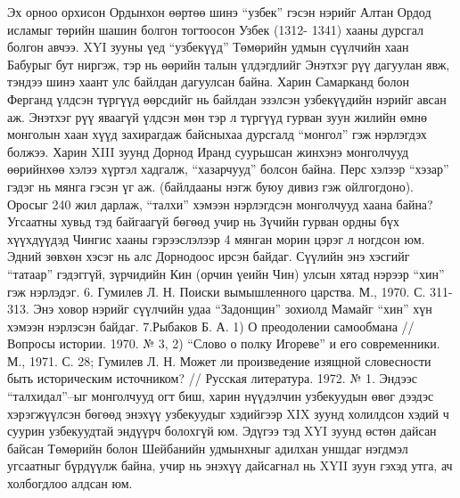 Эх орноо орхисон Ордынхон өөртөө шинэ “узбек” гэсэн нэрийг Алтан Ордод исламыг төрийн шашин болгон тогтоосон Узбек (1312- 1341) хааны дурсгал болгон авчээ. XYI зууны үед “узбекүүд” Төмөрийн удмын сүүлчийн хаан Бабурыг бут ниргэж, тэр нь өөрийн талын үлдэгдлийг Энэтхэг рүү дагуулан явж, тэндээ шинэ хаант улс байлдан дагуулсан байна. Харин Самарканд болон Ферганд үлдсэн түргүүд өөрсдийг нь байлдан эзэлсэн узбекүүдийн нэрийг авсан аж. Энэтхэг рүү яваагүй үлдсэн мөн тэр л түргүүд гурван зуун жилийн өмнө монголын хаан хүүд захирагдаж байсныхаа дурсгалд “монгол” гэж нэрлэгдэх болжээ. Харин XIII зуунд Дорнод Иранд суурьшсан жинхэнэ монголчууд өөрийнхөө хэлээ хүртэл хадгалж, “хазарчууд” болсон байна. Перс хэлээр “хэзар” гэдэг нь мянга гэсэн үг аж. (байлдааны нэгж буюу дивиз гэж ойлгогдоно). Оросыг 240 жил дарлаж, “талхи” хэмээн нэрлэгдсэн монголчууд хаана байна? Угсаатны хувьд тэд байгаагүй бөгөөд учир нь Зүчийн гурван ордны бүх хүүхдүүдэд Чингис хааны гэрээслэлээр 4 мянган морин цэрэг л ногдсон юм. Эдний зөвхөн хэсэг нь алс Дорнодоос ирсэн байдаг. Сүүлийн энэ хэсгийг “татаар” гэдэггүй, зүрчидийн Кин (орчин үеийн Чин) улсын хятад нэрээр “хин” гэж нэрлэдэг. 6. Гумилев Л. Н. Поиски вымышленного царства. М., 1970. С. 311-313. Энэ ховор нэрийг сүүлчийн удаа “Задонщин” зохиолд Мамайг “хин” хүн хэмээн нэрлэсэн байдаг. 7.Рыбаков Б. А. 1) О преодолении самообмана //Вопросы истории. 1970. № 3, 2) “Слово о полку Игореве” и его современники. М., 1971. С. 28; Гумилев Л. Н. Может ли произведение изящной словесности быть историческим источником? // Русская литература. 1972. № 1.
Эндээс “талхидал”–ыг монголчууд огт биш, харин нүүдэлчин узбекуудын өвөг дээдэс хэрэгжүүлсэн бөгөөд энэхүү узбекуудыг хэдийгээр XIX зуунд холилдсон хэдий ч суурин узбекуудтай эндүүрч болохгүй юм. Эдүгээ тэд XYI зуунд өстөн дайсан байсан Төмөрийн болон Шейбанийн удмынхныг адилхан уншдаг нэгдмэл угсаатныг бүрдүүлж байна, учир нь энэхүү дайсагнал нь XYII зуун гэхэд утга, ач холбогдлоо алдсан юм.

